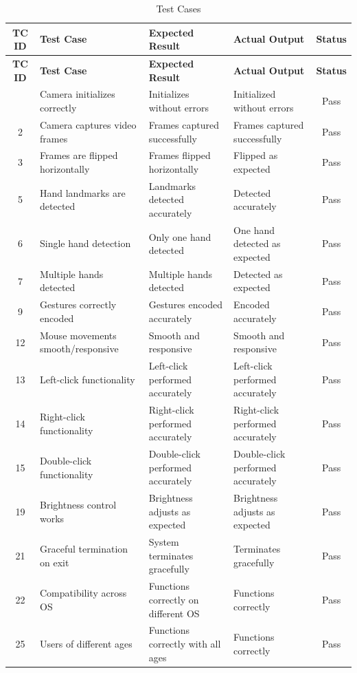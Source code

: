 \documentclass[12pt,a4paper]{report}
\begin{document}
\begin{enumerate}
\begin{longtable}{|c|p{3cm}|p{3cm}|p{3cm}|c|}
\caption{Test Cases} \label{tab:testcases} \\
\hline
\textbf{TC ID} & \textbf{Test Case} & \textbf{Expected Result} & \textbf{Actual Output} & \textbf{Status} \\
\hline
\endfirsthead
\hline
\textbf{TC ID} & \textbf{Test Case} & \textbf{Expected Result} & \textbf{Actual Output} & \textbf{Status} \\
\hline
\endhead
\hline
\endfoot
\hline
\endlastfoot
1  & Camera initializes correctly           & Initializes without errors        & Initialized without errors       & Pass \\
\hline
2  & Camera captures video frames           & Frames captured successfully      & Frames captured successfully     & Pass \\
\hline
3  & Frames are flipped horizontally        & Frames flipped horizontally       & Flipped as expected              & Pass \\
\hline
5  & Hand landmarks are detected            & Landmarks detected accurately     & Detected accurately              & Pass \\
\hline
6  & Single hand detection                  & Only one hand detected            & One hand detected as expected    & Pass \\
\hline
7  & Multiple hands detected                & Multiple hands detected           & Detected as expected             & Pass \\
\hline
9  & Gestures correctly encoded             & Gestures encoded accurately       & Encoded accurately               & Pass \\
\hline
12 & Mouse movements smooth/responsive      & Smooth and responsive             & Smooth and responsive            & Pass \\
\hline
13 & Left-click functionality               & Left-click performed accurately   & Left-click performed accurately  & Pass \\
\hline
14 & Right-click functionality              & Right-click performed accurately  & Right-click performed accurately & Pass \\
\hline
15 & Double-click functionality             & Double-click performed accurately & Double-click performed accurately & Pass \\
\hline
19 & Brightness control works               & Brightness adjusts as expected    & Brightness adjusts as expected   & Pass \\
\hline
21 & Graceful termination on exit           & System terminates gracefully      & Terminates gracefully            & Pass \\
\hline
22 & Compatibility across OS                & Functions correctly on different OS & Functions correctly            & Pass \\
\hline
25 & Users of different ages                & Functions correctly with all ages & Functions correctly              & Pass \\
\hline
\end{longtable}

\end{enumerate}
\end{document}
